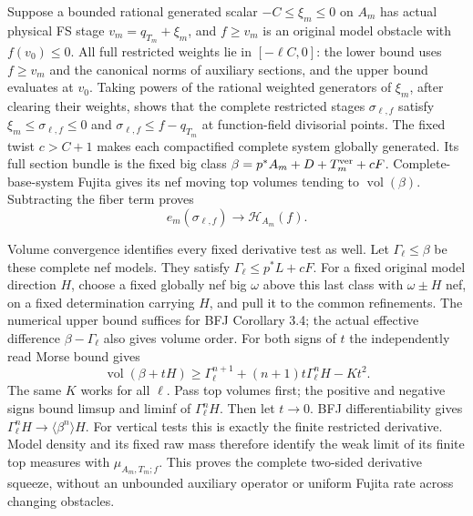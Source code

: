 \documentclass[10pt]{article}
\newcommand{\vol}{\operatorname{vol}}
\begin{document}
Suppose a bounded rational generated scalar $-C\leq\xi_m\leq0$
on $A_m$ has actual physical FS stage $v_m=q_{T_m}+\xi_m$, and
$f\geq v_m$ is an original model obstacle with $f(v_0)\leq0$.
All full restricted weights lie in $[-\ell C,0]$: the lower bound
uses $f\geq v_m$ and the canonical norms of auxiliary sections, and
the upper bound evaluates at $v_0$. Taking powers of the rational
weighted generators of $\xi_m$, after clearing their weights, shows
that the complete restricted stages $\sigma_{\ell,f}$ satisfy
$\xi_m\leq\sigma_{\ell,f}\leq0$ and
$\sigma_{\ell,f}\leq f-q_{T_m}$ at function-field divisorial points.
The fixed twist $c>C+1$ makes each compactified complete system
globally generated. Its full section bundle is the fixed big class
$\beta=p^*A_m+D+T_m^{\rm ver}+cF$.
Complete-base-system Fujita gives its nef moving top volumes tending
to $\vol(\beta)$. Subtracting the fiber term proves
\[
 e_m(\sigma_{\ell,f})\to\mathscr H_{A_m}(f).
 \tag{9.4}
\]

Volume convergence identifies every fixed derivative test as well.
Let $\Gamma_\ell\leq\beta$ be these complete nef models. They satisfy
$\Gamma_\ell\leq p^*L+cF$. For a fixed original model direction $H$,
choose a fixed globally nef big $\omega$ above this last class with
$\omega\pm H$ nef, on a fixed determination carrying $H$, and pull
it to the common refinements. The numerical upper bound suffices for
BFJ Corollary 3.4; the actual effective difference $\beta-\Gamma_\ell$
also gives volume order. For both signs of $t$ the independently read
Morse bound gives
\[
 \vol(\beta+tH)\geq\Gamma_\ell^{n+1}
             +(n+1)t\Gamma_\ell^nH-Kt^2.
 \tag{9.5}
\]
The same $K$ works for all $\ell$. Pass top volumes first; the positive
and negative signs bound limsup and liminf of $\Gamma_\ell^nH$.
Then let $t\to0$. BFJ differentiability gives
$\Gamma_\ell^nH\to\langle\beta^n\rangle H$.
For vertical tests this is exactly the finite restricted derivative.
Model density and its fixed raw mass therefore identify the weak limit
of its finite top measures with $\mu_{A_m,T_m;f}$. This proves the
complete two-sided derivative squeeze, without an unbounded auxiliary
operator or uniform Fujita rate across changing obstacles.
\end{document}
